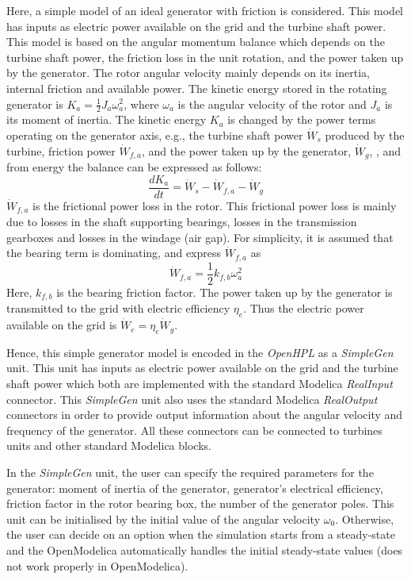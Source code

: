 \documentclass[%
]{USN-PhD}
\begin{document}
Here, a simple model of an ideal generator with friction is considered. This model has inputs as electric power available on the grid and the turbine shaft power. This model is based on the angular momentum balance which depends on the turbine shaft power, the friction loss in the unit rotation, and the power taken up by the generator. The rotor angular velocity mainly depends on its inertia, internal friction and available power. The kinetic energy stored in the rotating generator is $ K_a=\frac{1}{2}J_a\omega_a^2$, where $\omega_a$ is the angular velocity of the rotor and $J_a$ is its moment of inertia. The kinetic energy $K_a$ is changed by the power terms operating on the generator axis, e.g., the turbine shaft power $\dot{W}_s$ produced by the turbine, friction power $\dot{W}_{f,a}$, and the power taken up by the generator, $\dot{W}_g$, \cite{LieL:18}, and from energy the balance can be expressed as follows:
\begin{equation}
\frac{dK_a}{dt}=\dot{W}_s-\dot{W}_{f,a}-\dot{W}_g
\end{equation}
$\dot{W}_{f,a}$ is the frictional power loss in the rotor. This frictional power loss is mainly due to losses in the shaft supporting bearings, losses in the transmission gearboxes and losses in the windage (air gap). For simplicity, it is assumed that the bearing term is dominating, and express $\dot{W}_{f,a}$ as
\begin{equation}
\dot{W}_{f,a}=\frac{1}{2}k_{f,b}\omega_a^2
\end{equation}
Here, $k_{f,b}$ is the bearing friction factor. The power taken up by the generator is transmitted to the grid with electric efficiency $\eta_e$. Thus the electric power available on the grid is $\dot{W}_e=\eta_e\dot{W}_g$.

Hence, this simple generator model is encoded in the \emph{OpenHPL} as a \emph{SimpleGen} unit. This unit has inputs as electric power available on the grid and the turbine shaft power which both are implemented with the standard Modelica \emph{RealInput} connector. This \emph{SimpleGen} unit also uses the standard Modelica \emph{RealOutput} connectors in order to provide output information about the angular velocity and frequency of the generator. All these connectors can be connected to turbines units and other standard Modelica blocks.

In the \emph{SimpleGen} unit, the user can specify the required parameters for the generator: moment of inertia of the generator, generator's electrical efficiency, friction factor in the rotor bearing box, the number of the generator poles. This unit can be initialised by the initial value of the angular velocity $\omega_0$. Otherwise, the user can decide on an option when the simulation starts from a steady-state and the OpenModelica automatically handles the initial steady-state values (does not work properly in OpenModelica).
\end{document}

